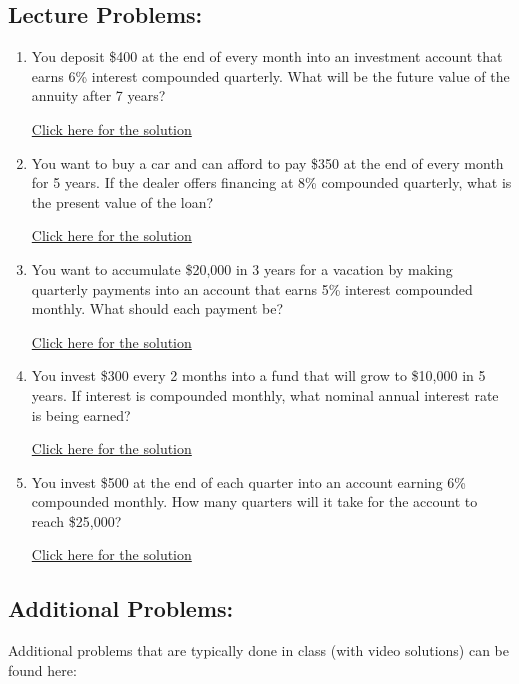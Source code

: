 \documentclass[
]{book}
\providecommand{\tightlist}{%
  \setlength{\itemsep}{0pt}\setlength{\parskip}{0pt}}
\begin{document}
\subsection*{Lecture Problems:}\label{lecture-problems-14}

\begin{enumerate}
\def\labelenumi{\arabic{enumi}.}
\tightlist
\item
  You deposit \$400 at the end of every month into an investment account that earns 6\% interest compounded quarterly. What will be the future value of the annuity after 7 years?

  \href{https://youtu.be/59s8zc-RoA4}{Click here for the solution}
\item
  You want to buy a car and can afford to pay \$350 at the end of every month for 5 years. If the dealer offers financing at 8\% compounded quarterly, what is the present value of the loan?

  \href{https://youtu.be/wi6EyYtNxRA}{Click here for the solution}
\item
  You want to accumulate \$20,000 in 3 years for a vacation by making quarterly payments into an account that earns 5\% interest compounded monthly. What should each payment be?

  \href{https://youtu.be/xtDl74YNEW4}{Click here for the solution}
\item
  You invest \$300 every 2 months into a fund that will grow to \$10,000 in 5 years. If interest is compounded monthly, what nominal annual interest rate is being earned?

  \href{https://youtu.be/rYzyGRqF71c}{Click here for the solution}
\item
  You invest \$500 at the end of each quarter into an account earning 6\% compounded monthly. How many quarters will it take for the account to reach \$25,000?

  \href{https://youtu.be/Khm8FadwIGA}{Click here for the solution}
\end{enumerate}

\subsection*{Additional Problems:}\label{additional-problems-14}

Additional problems that are typically done in class (with video solutions) can be found here:
\end{document}
